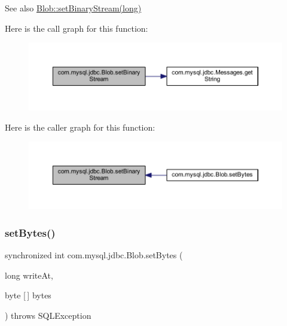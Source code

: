 \begin{DoxySeeAlso}{See also}
\mbox{\hyperlink{classcom_1_1mysql_1_1jdbc_1_1_blob_afa722f94370d179ecd4275e8717751a2}{Blob\+::set\+Binary\+Stream(long)}} 
\end{DoxySeeAlso}
Here is the call graph for this function\+:\nopagebreak
\begin{figure}[H]
\begin{center}
\leavevmode
\includegraphics[width=350pt]{classcom_1_1mysql_1_1jdbc_1_1_blob_afa722f94370d179ecd4275e8717751a2_cgraph}
\end{center}
\end{figure}
Here is the caller graph for this function\+:\nopagebreak
\begin{figure}[H]
\begin{center}
\leavevmode
\includegraphics[width=350pt]{classcom_1_1mysql_1_1jdbc_1_1_blob_afa722f94370d179ecd4275e8717751a2_icgraph}
\end{center}
\end{figure}
\mbox{\label{classcom_1_1mysql_1_1jdbc_1_1_blob_a229c3ca9696de0a5d230671e1adea557}} 
\subsubsection{\texorpdfstring{set\+Bytes()}{setBytes()}\hspace{0.1cm}{\footnotesize\ttfamily [1/2]}}
{\footnotesize\ttfamily synchronized int com.\+mysql.\+jdbc.\+Blob.\+set\+Bytes (\begin{DoxyParamCaption}\item[{long}]{write\+At,  }\item[{byte \mbox{[}$\,$\mbox{]}}]{bytes }\end{DoxyParamCaption}) throws S\+Q\+L\+Exception}

